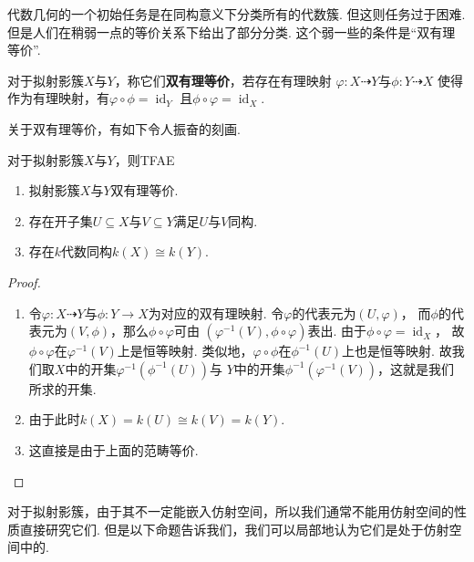     代数几何的一个初始任务是在同构意义下分类所有的代数簇. 但这则任务过于困难. 
    但是人们在稍弱一点的等价关系下给出了部分分类. 这个弱一些的条件是“双有理等价”.
    \begin{definition}
        对于拟射影簇$X$与$Y$，称它们\textbf{双有理等价}，若存在有理映射
        $\varphi\colon X \dashrightarrow Y$与$\phi\colon Y \dashrightarrow X$
        使得作为有理映射，有$\varphi \circ \phi = \operatorname{id}_{Y}$
        且$\phi \circ \varphi = \operatorname{id}_{X}$.
    \end{definition}

    关于双有理等价，有如下令人振奋的刻画.
    \begin{theorem}
        对于拟射影簇$X$与$Y$，则TFAE
        \begin{enumerate}
            \item[(1)] 拟射影簇$X$与$Y$双有理等价.
            \item[(2)] 存在开子集$U \subseteq X$与$V \subseteq Y$满足$U$与$V$同构.
            \item[(3)] 存在$k$代数同构$k(X) \cong k(Y)$.
        \end{enumerate}
    \end{theorem}
    \begin{proof}
        \begin{enumerate}
            \item[(1) $\Rightarrow$ (2)]
            令$\varphi\colon X \dashrightarrow Y$与$\phi\colon Y \rightarrow X$为对应的双有理映射.
            令$\varphi$的代表元为$(U,\varphi)$，
            而$\phi$的代表元为$(V,\phi)$，那么$\phi \circ \varphi$可由
            $(\varphi^{-1}(V),\phi \circ \varphi)$表出. 
            由于$\phi \circ \varphi = \operatorname{id}_{X}$，
            故$\phi \circ \varphi$在$\varphi^{-1}(V)$上是恒等映射. 
            类似地，$\varphi \circ \phi$在$\phi^{-1}(U)$上也是恒等映射.
            故我们取$X$中的开集$\varphi^{-1}(\phi^{-1}(U))$与
            $Y$中的开集$\phi^{-1}(\varphi^{-1}(V))$，这就是我们所求的开集.
            \item[(2) $\Rightarrow$ (3)]
            由于此时$k(X)=k(U) \cong k(V)=k(Y)$.
            \item[(3) $\Rightarrow$ (1)]
            这直接是由于上面的范畴等价.\qedhere
        \end{enumerate}
    \end{proof}

    对于拟射影簇，由于其不一定能嵌入仿射空间，所以我们通常不能用仿射空间的性质直接研究它们.
    但是以下命题告诉我们，我们可以局部地认为它们是处于仿射空间中的.
   

